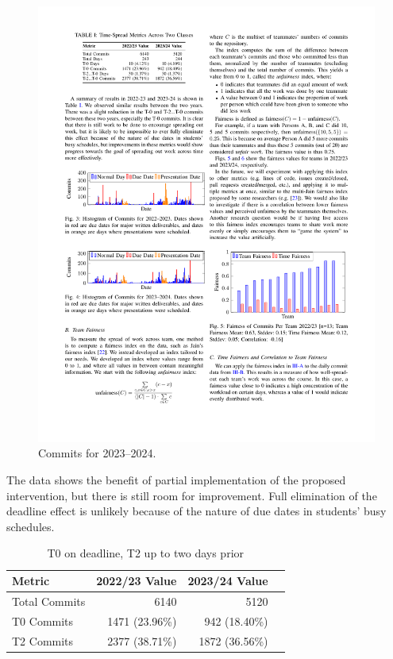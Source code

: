 \documentclass[poster, a0, plainboxedsections]{sciposter}
\begin{document}
\begin{multicols}{2}
\begin{figure}[h!]
\centering
\includegraphics[width=0.9\linewidth]{../figures/HistCommits2023-24.pdf}
\caption{Commits for 2023--2024.}\label{Fig_23_24Timeline}
\end{figure}

The data shows the benefit of partial implementation of the proposed
intervention, but there is still room for improvement. Full elimination of
the deadline effect is unlikely because of the nature of due dates in students' busy
schedules.

\begin{table}
\caption{T0 on deadline, T2 up to two days prior}
\centering
\begin{tabular}{@{}lrrr@{}}
\toprule
\textbf{Metric} & \textbf{2022/23 Value} & \textbf{2023/24 Value} \\ 
\midrule
Total Commits & 6140 & 5120 \\
T0 Commits & 1471 (23.96\%) & 942 (18.40\%) \\
T2 Commits & 2377 (38.71\%) & 1872 (36.56\%) \\ 
\bottomrule
\end{tabular}
\end{table}


\end{multicols}
\end{document}
